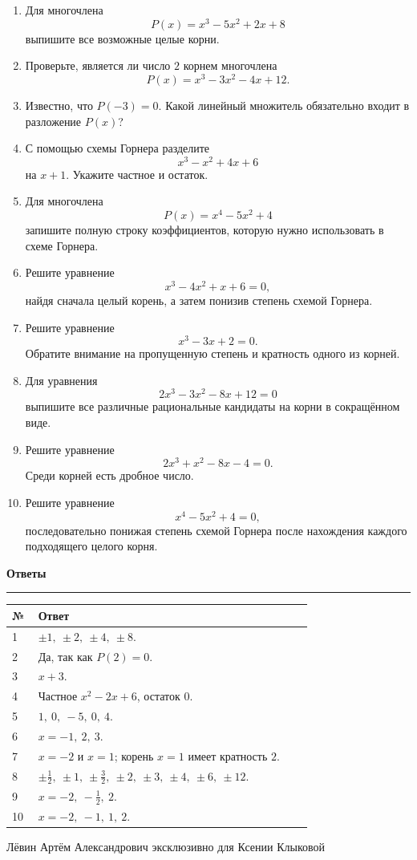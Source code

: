\documentclass[a4paper,12pt]{article}
\newcommand{\sectiontitle}[1]{%
  \vspace{0.55em}%
  {\Large\bfseries\color{darkaccent}#1}\par
  \vspace{0.25em}\color{linegray}\hrule\color{textgray}\vspace{0.45em}
}
\begin{document}
\begin{enumerate}[label=\textbf{\arabic*.},itemsep=0.28em,topsep=0.25em]
  \item Для многочлена
  \[
  P(x)=x^3-5x^2+2x+8
  \]
  выпишите все возможные целые корни.

  \item Проверьте, является ли число $2$ корнем многочлена
  \[
  P(x)=x^3-3x^2-4x+12.
  \]

  \item Известно, что $P(-3)=0$. Какой линейный множитель обязательно входит в разложение $P(x)$?

  \item С помощью схемы Горнера разделите
  \[
  x^3-x^2+4x+6
  \]
  на $x+1$. Укажите частное и остаток.

  \item Для многочлена
  \[
  P(x)=x^4-5x^2+4
  \]
  запишите полную строку коэффициентов, которую нужно использовать в схеме Горнера.

  \item Решите уравнение
  \[
  x^3-4x^2+x+6=0,
  \]
  найдя сначала целый корень, а затем понизив степень схемой Горнера.

  \item Решите уравнение
  \[
  x^3-3x+2=0.
  \]
  Обратите внимание на пропущенную степень и кратность одного из корней.

  \item Для уравнения
  \[
  2x^3-3x^2-8x+12=0
  \]
  выпишите все различные рациональные кандидаты на корни в сокращённом виде.

  \item Решите уравнение
  \[
  2x^3+x^2-8x-4=0.
  \]
  Среди корней есть дробное число.

  \item Решите уравнение
  \[
  x^4-5x^2+4=0,
  \]
  последовательно понижая степень схемой Горнера после нахождения каждого подходящего целого корня.
\end{enumerate}
\endgroup

\clearpage

\sectiontitle{Ответы}
\begin{longtable}{@{}p{0.08\linewidth}p{0.84\linewidth}@{}}
\toprule
\textbf{№} & \textbf{Ответ}\\
\midrule
\endhead
1 & $\pm1,\ \pm2,\ \pm4,\ \pm8$.\\
2 & Да, так как $P(2)=0$.\\
3 & $x+3$.\\
4 & Частное $x^2-2x+6$, остаток $0$.\\
5 & $1,\ 0,\ -5,\ 0,\ 4$.\\
6 & $x=-1,\ 2,\ 3$.\\
7 & $x=-2$ и $x=1$; корень $x=1$ имеет кратность $2$.\\
8 & $\pm\frac12,\ \pm1,\ \pm\frac32,\ \pm2,\ \pm3,\ \pm4,\ \pm6,\ \pm12$.\\
9 & $x=-2,\ -\frac12,\ 2$.\\
10 & $x=-2,\ -1,\ 1,\ 2$.\\
\bottomrule
\end{longtable}

\vfill
\begin{center}
{\small\color{softgray}Лёвин Артём Александрович эксклюзивно для Ксении Клыковой}
\end{center}
\end{document}
